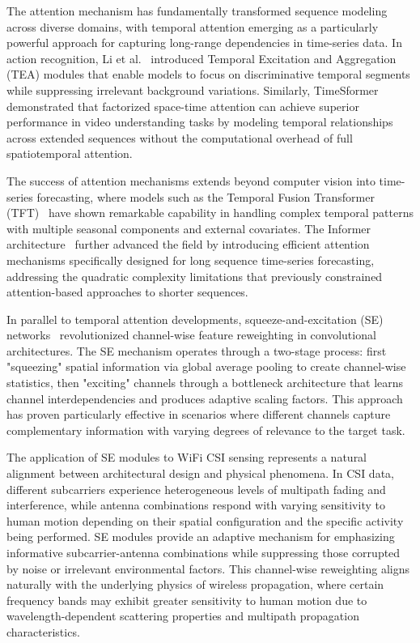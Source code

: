 \documentclass[journal]{IEEEtran}
\begin{document}
The attention mechanism has fundamentally transformed sequence modeling across diverse domains, with temporal attention emerging as a particularly powerful approach for capturing long-range dependencies in time-series data. In action recognition, Li et al.~\cite{li2020tea} introduced Temporal Excitation and Aggregation (TEA) modules that enable models to focus on discriminative temporal segments while suppressing irrelevant background variations. Similarly, TimeSformer~\cite{bertasius2021timesformer} demonstrated that factorized space-time attention can achieve superior performance in video understanding tasks by modeling temporal relationships across extended sequences without the computational overhead of full spatiotemporal attention.

The success of attention mechanisms extends beyond computer vision into time-series forecasting, where models such as the Temporal Fusion Transformer (TFT)~\cite{lim2021tft} have shown remarkable capability in handling complex temporal patterns with multiple seasonal components and external covariates. The Informer architecture~\cite{zhou2021informer} further advanced the field by introducing efficient attention mechanisms specifically designed for long sequence time-series forecasting, addressing the quadratic complexity limitations that previously constrained attention-based approaches to shorter sequences.

In parallel to temporal attention developments, squeeze-and-excitation (SE) networks~\cite{se_networks2018} revolutionized channel-wise feature reweighting in convolutional architectures. The SE mechanism operates through a two-stage process: first "squeezing" spatial information via global average pooling to create channel-wise statistics, then "exciting" channels through a bottleneck architecture that learns channel interdependencies and produces adaptive scaling factors. This approach has proven particularly effective in scenarios where different channels capture complementary information with varying degrees of relevance to the target task.

The application of SE modules to WiFi CSI sensing represents a natural alignment between architectural design and physical phenomena. In CSI data, different subcarriers experience heterogeneous levels of multipath fading and interference, while antenna combinations respond with varying sensitivity to human motion depending on their spatial configuration and the specific activity being performed. SE modules provide an adaptive mechanism for emphasizing informative subcarrier-antenna combinations while suppressing those corrupted by noise or irrelevant environmental factors. This channel-wise reweighting aligns naturally with the underlying physics of wireless propagation, where certain frequency bands may exhibit greater sensitivity to human motion due to wavelength-dependent scattering properties and multipath propagation characteristics.
\end{document}
